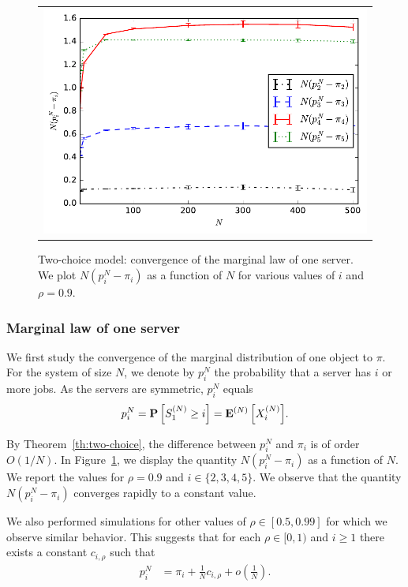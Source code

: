 \documentclass[sigconf]{acmart}
\newcommand\SN{S^{(N)}}
\newcommand\XN{X^{(N)}}
\newcommand\espN[1]{{\mathchoice{\bespN{#1}}{\sespN{#1}}{\sespN{#1}}{\sespN{#1}}}}
\newcommand\bespN[1]{\mathbf{E}^{(N)}\left[#1\right]}
\newcommand\sespN[1]{\mathbf{E}^{(N)}[#1]}
\newcommand\Proba[1]{\mathbf{P}\left[#1\right]}
\newcommand\p[1]{\left(#1\right)}
\begin{document}
\begin{figure}[t]
  \centering
  \begin{tabular}{@{}c@{}}
    \includegraphics[width=\linewidth]{2choice_convergence_rho90}\\
  \end{tabular}
  \caption{Two-choice model: convergence of the marginal law of one
    server. We plot $N(p^N_i-\pi_i)$ as a function of $N$ for various
    values of $i$ and $\rho=0.9$. }
  \label{fig:2-choice_x}
\end{figure}

\subsubsection{Marginal law of one server}

We first study the convergence of the marginal distribution of one
object to $\pi$. For the system of size $N$, we denote by $p^N_i$ the
probability that a server has $i$ or more jobs. As the servers are
symmetric, $p^N_i$ equals
\begin{align*}
  p^N_i=\Proba{\SN_1\ge i} = \espN{\XN_i}. 
\end{align*}

By Theorem~\ref{th:two-choice}, the difference between $p^N_i$ and
$\pi_i$ is of order $O(1/N)$. In Figure~\ref{fig:2-choice_x}, we
display the quantity $N(p^N_i-\pi_i)$ as a function of $N$. We report
the values for $\rho=0.9$ and $i\in\{2,3,4,5\}$. We observe that the
quantity $N(p^N_i-\pi_i)$ converges rapidly to a constant value. 

We also performed simulations for other values of $\rho\in[0.5,0.99]$
for which we observe similar behavior.  This suggests that for each
$\rho\in[0,1)$ and $i\ge1$ there exists a constant $c_{i,\rho}$ such
that
\begin{align}
  \label{eq:c_i_rho}
  p^N_i&=\pi_i + \frac1N c_{i,\rho} + o\p{\frac1N}.
\end{align}
\end{document}
